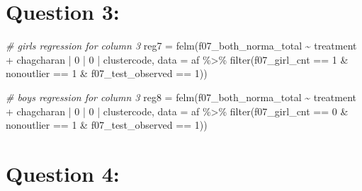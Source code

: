 \documentclass[
]{article}
\newenvironment{Shaded}{\begin{snugshade}}{\end{snugshade}}
\newcommand{\AttributeTok}[1]{\textcolor[rgb]{0.77,0.63,0.00}{#1}}
\newcommand{\CommentTok}[1]{\textcolor[rgb]{0.56,0.35,0.01}{\textit{#1}}}
\newcommand{\DecValTok}[1]{\textcolor[rgb]{0.00,0.00,0.81}{#1}}
\newcommand{\FunctionTok}[1]{\textcolor[rgb]{0.00,0.00,0.00}{#1}}
\newcommand{\NormalTok}[1]{#1}
\newcommand{\OtherTok}[1]{\textcolor[rgb]{0.56,0.35,0.01}{#1}}
\newcommand{\SpecialCharTok}[1]{\textcolor[rgb]{0.00,0.00,0.00}{#1}}
\begin{document}
\hypertarget{question-3}{%
\section{Question 3:}\label{question-3}}

\begin{Shaded}
\begin{Highlighting}[]
\CommentTok{\# girls regression for column 3}
\NormalTok{reg7 }\OtherTok{=} \FunctionTok{felm}\NormalTok{(f07\_both\_norma\_total }\SpecialCharTok{\textasciitilde{}}\NormalTok{ treatment }\SpecialCharTok{+}\NormalTok{ chagcharan }\SpecialCharTok{|} \DecValTok{0} \SpecialCharTok{|} \DecValTok{0} \SpecialCharTok{|}\NormalTok{ clustercode, }
            \AttributeTok{data =}\NormalTok{ af }\SpecialCharTok{\%\textgreater{}\%} \FunctionTok{filter}\NormalTok{(f07\_girl\_cnt }\SpecialCharTok{==} \DecValTok{1} \SpecialCharTok{\&} 
\NormalTok{                                 nonoutlier }\SpecialCharTok{==} \DecValTok{1} \SpecialCharTok{\&}
\NormalTok{                                 f07\_test\_observed }\SpecialCharTok{==} \DecValTok{1}\NormalTok{))}

\CommentTok{\# boys regression for column 3}
\NormalTok{reg8 }\OtherTok{=} \FunctionTok{felm}\NormalTok{(f07\_both\_norma\_total }\SpecialCharTok{\textasciitilde{}}\NormalTok{ treatment }\SpecialCharTok{+}\NormalTok{ chagcharan }\SpecialCharTok{|} \DecValTok{0} \SpecialCharTok{|} \DecValTok{0} \SpecialCharTok{|}\NormalTok{ clustercode, }
            \AttributeTok{data =}\NormalTok{ af }\SpecialCharTok{\%\textgreater{}\%} \FunctionTok{filter}\NormalTok{(f07\_girl\_cnt }\SpecialCharTok{==} \DecValTok{0} \SpecialCharTok{\&} 
\NormalTok{                                 nonoutlier }\SpecialCharTok{==} \DecValTok{1} \SpecialCharTok{\&}
\NormalTok{                                 f07\_test\_observed }\SpecialCharTok{==} \DecValTok{1}\NormalTok{))}
\end{Highlighting}
\end{Shaded}

\hypertarget{question-4}{%
\section{Question 4:}\label{question-4}}
\end{document}
